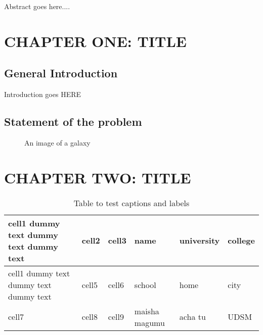 \documentclass[12pt]{report}    %
\begin{document}
Abstract goes here.... 
\begin{center}
    
\cleardoublepage %
\tableofcontents

\listoftables


\cleardoublepage
\listoffigures
\end{center} 
\newpage



\chapter{\MakeUppercase{chapter one: title}} 
\section{General Introduction} 
\blindtext
Introduction goes HERE
\section{Statement of the problem}
\blindtext


\begin{figure}[htp]
    \centering
    \caption{An image of a galaxy}
    \label{fig:galaxy}
\end{figure}



\chapter{\MakeUppercase{chapter Two: title }} 

\begin{table}[h!]
    \centering
\begin{tabular}{ | m{7em} | m{3em}| m{3em} | m{3em} | m{3em} |m{3em} |} 
\hline
cell1 dummy text dummy text dummy text & cell2 & cell3 & name & university & college\\ 
\hline
cell1 dummy text dummy text dummy text & cell5 & cell6 & school & home & city\\ 
\hline
cell7 & cell8 & cell9 & maisha magumu & acha tu & UDSM\\
\hline
\end{tabular}
\caption{Table to test captions and labels}
\label{table:1}
\end{table}
\blindtext
\end{document}
